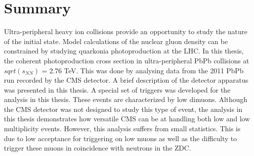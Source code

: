 \chapter{Summary}	
  Ultra-peripheral heavy ion collisions provide an opportunity to study 
    the nature of the initial state. 
  Model calculations of the nuclear gluon density can be constrained by 
    studying quarkonia photoproduction at the LHC.
  In this thesis, the coherent \JPsi{} photoproduction cross section in 
    ultra-peripheral PbPb collisions at $sqrt(s_{NN})$ = 2.76 TeV.
  This was done by analysing data from the 2011 PbPb run recorded by the CMS 
    detector.
  A brief description of the detector apparatus was presented in this thesis.
  A special set of triggers was developed for the analysis in this thesis.
  These events are characterized by low \pt{} dimuons.
  Although the CMS detector was not designed to study this type of event, the
    analysis in this thesis demonstrates how versatile CMS can be at handling 
    both low \pt{} and low multiplicity events. 
  However, this analysis suffers from small statistics. 
  This is due to low acceptance for triggering on low \pt{} muons as well as 
    the difficulty to trigger these muons in coincidence with neutrons in the 
    ZDC.
  
    
  
